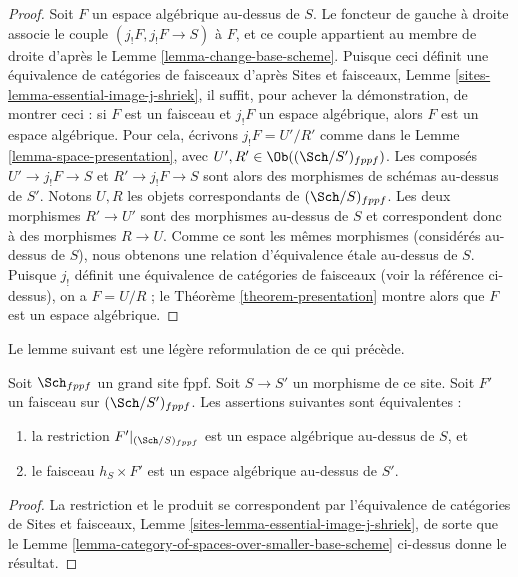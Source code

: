 \begin{proof}
Soit $F$ un espace algébrique au-dessus de $S$. Le foncteur de gauche à droite
associe le couple $(j_!F, j_!F \to S)$ à $F$,
et ce couple appartient au membre de droite d'après le
Lemme \ref{lemma-change-base-scheme}.
Puisque ceci définit une équivalence de catégories de faisceaux d'après
Sites et faisceaux, Lemme \ref{sites-lemma-essential-image-j-shriek},
il suffit, pour achever la démonstration, de montrer ceci :
si $F$ est un faisceau et $j_!F$ un espace algébrique, alors $F$
est un espace algébrique. Pour cela, écrivons
$j_!F = U'/R'$ comme dans le
Lemme \ref{lemma-space-presentation},
avec $U', R' \in \Ob((\Sch/S')_{fppf})$.
Les composés $U' \to j_!F \to S$ et $R' \to j_!F \to S$
sont alors des morphismes de schémas au-dessus de $S'$. Notons $U, R$ les
objets correspondants de $(\Sch/S)_{fppf}$. Les deux morphismes
$R' \to U'$ sont des morphismes au-dessus de $S$ et correspondent donc à des
morphismes $R \to U$. Comme ce sont les mêmes
morphismes (considérés au-dessus de $S$), nous obtenons une relation
d'équivalence \'etale au-dessus de $S$. Puisque $j_!$ définit une équivalence de
catégories de faisceaux (voir la référence ci-dessus), on a
$F = U/R$ ; le
Théorème \ref{theorem-presentation}
montre alors que $F$ est un espace algébrique.
\end{proof}

\noindent
Le lemme suivant est une légère reformulation de ce qui précède.

\begin{lemma}
\label{lemma-rephrase}
Soit $\Sch_{fppf}$ un grand site fppf.
Soit $S \to S'$ un morphisme de ce site.
Soit $F'$ un faisceau sur $(\Sch/S')_{fppf}$.
Les assertions suivantes sont équivalentes :
\begin{enumerate}
\item la restriction $F'|_{(\Sch/S)_{fppf}}$
est un espace algébrique au-dessus de $S$, et
\item le faisceau $h_S \times F'$ est un espace algébrique au-dessus de $S'$.
\end{enumerate}
\end{lemma}

\begin{proof}
La restriction et le produit se correspondent par
l'équivalence de catégories de
Sites et faisceaux, Lemme \ref{sites-lemma-essential-image-j-shriek},
de sorte que le
Lemme \ref{lemma-category-of-spaces-over-smaller-base-scheme}
ci-dessus donne le résultat.
\end{proof}

